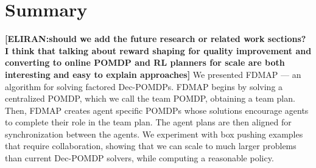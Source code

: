 \documentclass[letterpaper]{article} %
\theoremstyle{definition}
\newcommand{\commentout}[1]{}
\newcommand{\eliran}[1]{\textbf{[\color{red}ELIRAN:#1]}}
\newcommand{\guy}[1]{\textbf{[\color{orange}GUY:#1]}}
\begin{document}
\commentout{
\section{Related Work}

\guy{This still requires work}
QDec-POMDPs~\cite{QDECPOMDP} are qualitative version of Dec-POMDPS that tackle a conceptually simpler, more structured, model. In QDec-POMDPs 
non-determinism replaces stochastic uncertainty. The model is factored (i.e., described at the level of state variables rather than states), and actions 
are described using preconditions and non-determinstic effects. Although QDec-POMDPs are also NEXT-Time hard, recent work in the area that leverages heuristic-search planners, has been able to scale up to much larger domains (e.g., box pushing on a grid of size 24,  12 agents and 12 boxes, implying a state space of $24^{24}$)
albeit, under the assumptions that actions are deterministic.

Dec-POMDP algorithms.
}

\section{Summary}
\eliran{should we add the future research or related work sections? I think that talking about reward shaping for quality improvement and converting to online POMDP and RL planners for scale are both interesting and easy to explain approaches}
We presented FDMAP --- an algorithm for solving factored Dec-POMDPs. FDMAP begins by solving a centralized POMDP, which we call the team POMDP, obtaining a team plan. Then, FDMAP creates agent specific POMDPs whose solutions encourage agents to complete their role in the team plan. The agent plans are then aligned for synchronization between the agents. We experiment with box pushing examples that require collaboration, showing that we can scale to much larger problems than current Dec-POMDP solvers, while computing a reasonable policy.
\end{document}
